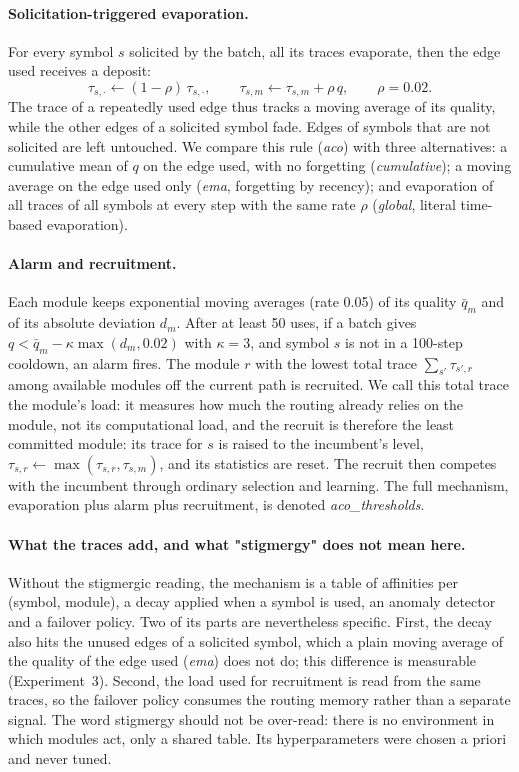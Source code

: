 \documentclass[11pt,a4paper]{article}
\begin{document}
\paragraph{Solicitation-triggered evaporation.} For every symbol $s$ solicited by the batch, all its traces evaporate, then the edge used receives a deposit:
\begin{equation}
\tau_{s,\cdot} \leftarrow (1-\rho)\,\tau_{s,\cdot}, \qquad \tau_{s,m} \leftarrow \tau_{s,m} + \rho\, q, \qquad \rho = 0.02.
\end{equation}
The trace of a repeatedly used edge thus tracks a moving average of its quality, while the other edges of a solicited symbol fade. Edges of symbols that are not solicited are left untouched. We compare this rule (\emph{aco}) with three alternatives: a cumulative mean of $q$ on the edge used, with no forgetting (\emph{cumulative}); a moving average on the edge used only (\emph{ema}, forgetting by recency); and evaporation of all traces of all symbols at every step with the same rate $\rho$ (\emph{global}, literal time-based evaporation).

\paragraph{Alarm and recruitment.} Each module keeps exponential moving averages (rate 0.05) of its quality $\bar q_m$ and of its absolute deviation $d_m$. After at least 50 uses, if a batch gives $q < \bar q_m - \kappa \max(d_m, 0.02)$ with $\kappa = 3$, and symbol $s$ is not in a 100-step cooldown, an alarm fires. The module $r$ with the lowest total trace $\sum_{s'} \tau_{s',r}$ among available modules off the current path is recruited. We call this total trace the module's load: it measures how much the routing already relies on the module, not its computational load, and the recruit is therefore the least committed module: its trace for $s$ is raised to the incumbent's level, $\tau_{s,r} \leftarrow \max(\tau_{s,r}, \tau_{s,m})$, and its statistics are reset. The recruit then competes with the incumbent through ordinary selection and learning. The full mechanism, evaporation plus alarm plus recruitment, is denoted \emph{aco\_thresholds}.

\paragraph{What the traces add, and what "stigmergy" does not mean here.} Without the stigmergic reading, the mechanism is a table of affinities per (symbol, module), a decay applied when a symbol is used, an anomaly detector and a failover policy. Two of its parts are nevertheless specific. First, the decay also hits the unused edges of a solicited symbol, which a plain moving average of the quality of the edge used (\emph{ema}) does not do; this difference is measurable (Experiment~3). Second, the load used for recruitment is read from the same traces, so the failover policy consumes the routing memory rather than a separate signal. The word stigmergy should not be over-read: there is no environment in which modules act, only a shared table. Its hyperparameters were chosen a priori and never tuned.
\end{document}
